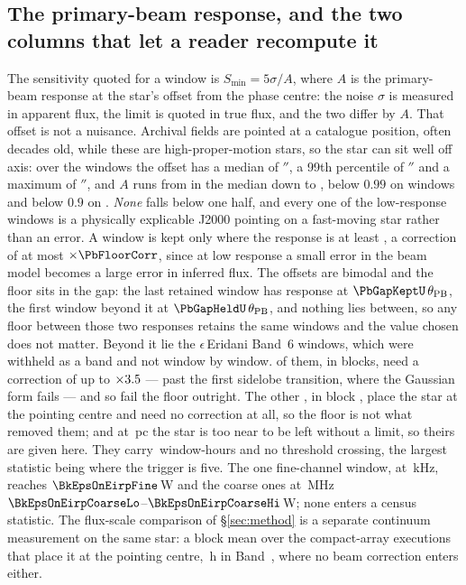 \subsection{The primary-beam response, and the two columns that let a reader
recompute it}

The sensitivity quoted for a window is $S_{\min}=5\sigma/A$, where $A$ is the
primary-beam response at the star's offset from the phase centre: the noise
$\sigma$ is measured in apparent flux, the limit is quoted in true flux, and
the two differ by $A$. That offset is not a nuisance. Archival fields are
pointed at a catalogue position, often decades old, while these are
high-proper-motion stars, so the star can sit well off axis: over the
\PbNWin{} windows the offset has a median of \PbOffMed$''$, a 99th
percentile of \PbOffPNN$''$ and a maximum of \PbOffMax$''$, and $A$ runs from
\PbAMed{} in the median down to \PbAMin, below $0.99$ on \PbNLowNN{} windows
and below $0.9$ on \PbNLowN. \emph{None} falls below one half, and every one
of the low-response windows is a physically explicable J2000 pointing on a
fast-moving star rather than an error. A window is kept only where the
response is at least \PbFloorResp, a correction of at most
$\times\PbFloorCorr$, since at low response a small error in the beam model
becomes a large error in inferred flux. The offsets are bimodal and the floor
sits in the gap: the last retained window has response \PbGapKeptResp{} at
$\PbGapKeptU\,\theta_{\rm PB}$, the first window beyond it \PbGapHeldResp{}
at $\PbGapHeldU\,\theta_{\rm PB}$, and nothing lies between, so any floor
between those two responses retains the same \NWindows{} windows and the
value chosen does not matter.
Beyond it lie the \EpsEriNWin{} $\epsilon$\,Eridani Band~6 windows, which
were withheld as a band and not window by window. \EpsEriNOffAxis{} of them,
in \LqEpsOffEb{} blocks, need a correction of up to
$\times3.5$ --- past the first sidelobe transition, where the
Gaussian form fails --- and so fail the floor outright. The other
\EpsEriNOnAxis, in block \texttt{\BkEpsOnBlock}, place the star at the
pointing centre and need no correction at all, so the floor is not what
removed them; and at \EpsEriDistPc\,pc the star is too near to be left
without a limit, so theirs are given here. They carry
\BkEpsOnHours\,window-hours and no threshold crossing, the largest statistic
being \BkEpsOnTMax{} where the trigger is five. The one fine-channel window,
at \BkEpsOnChanFineKHz\,kHz, reaches $\BkEpsOnEirpFine$\,W and the
\BkEpsOnNCoarse{} coarse ones at \BkEpsOnChanCoarseMHz\,MHz
$\BkEpsOnEirpCoarseLo$--$\BkEpsOnEirpCoarseHi$\,W; none enters a census
statistic. The flux-scale comparison of
\S\ref{sec:method} is a separate continuum measurement on the same star: a
block mean over the \PxEpsN{} compact-array executions that place it at the
pointing centre, \PxEpsHours\,h in Band~\PxEpsBand, where no beam correction
enters either.

